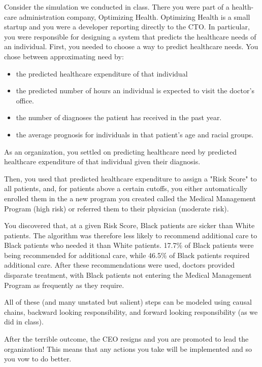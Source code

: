 \documentclass[submit]{harvardml}
\begin{document}
\begin{problem}

Consider the simulation we conducted in class. There you were part of a health-care administration company, Optimizing Health. Optimizing Health is a small startup and you were a developer reporting directly to the CTO. In particular, you were responsible for designing a system that predicts the healthcare needs of an individual. First, you needed to choose a way to predict healthcare needs. You chose between approximating need by:

\begin{itemize}
    \item the predicted healthcare expenditure of that individual
    \item the predicted number of hours an individual is expected to visit the doctor’s office.
    \item the number of diagnoses the patient has received in the past year.
    \item the average prognosis for individuals in that patient’s age and racial groups.
\end{itemize}

As an organization, you settled on predicting healthcare need by predicted healthcare expenditure of that individual given their diagnosis.

Then, you used that predicted healthcare expenditure to assign a "Risk Score" to all patients, and, for patients above a certain cutoffs, you either automatically enrolled them in the a new program you created called the Medical Management Program (high risk) or referred them to their physician (moderate risk).

You discovered that, at a given Risk Score, Black patients are sicker than White patients. The algorithm was therefore less likely to recommend additional care to Black patients who needed it than White patients. 17.7$\%$ of Black patients were being recommended for additional care, while 46.5$\%$ of Black patients required additional care. After these recommendations were used, doctors provided disparate treatment, with Black patients not entering the Medical Management Program as frequently as they require.

All of these (and many unstated but salient) steps can be modeled using causal chains, backward looking responsibility, and forward looking responsibility (as we did in class).

After the terrible outcome, the CEO resigns and you are promoted to lead the organization! This means that any actions you take will be implemented and so you vow to do better. 


\end{problem}
\end{document}
